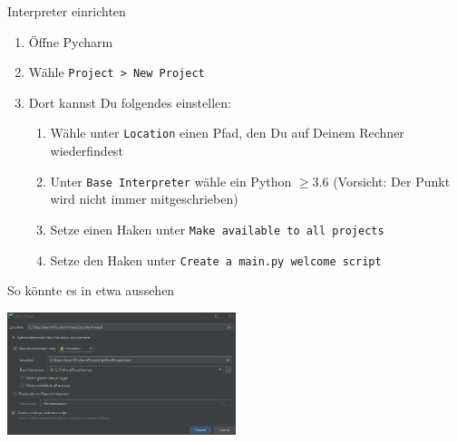 \begin{frame}
\begin{block}{Interpreter einrichten}
\begin{enumerate}
\item Öffne Pycharm
\item Wähle \texttt{Project > New Project}
\item Dort kannst Du folgendes einstellen:
\begin{enumerate}
	\item Wähle unter \texttt{Location} einen Pfad, den Du auf Deinem Rechner wiederfindest
	\item Unter \texttt{Base Interpreter} wähle ein Python $\geq 3.6$ (Vorsicht: Der Punkt wird nicht immer mitgeschrieben)
	\item Setze einen Haken unter \texttt{Make available to all projects} 
	\item Setze den Haken unter \texttt{Create a main.py welcome script}
\end{enumerate}
\end{enumerate}	
\end{block}

\pause 

\begin{block}{So könnte es in etwa aussehen}
	
	\begin{center}
		\includegraphics[width=0.5\textwidth]{python_interpreter.jpg}
	\end{center}
	
\end{block}

\end{frame}


